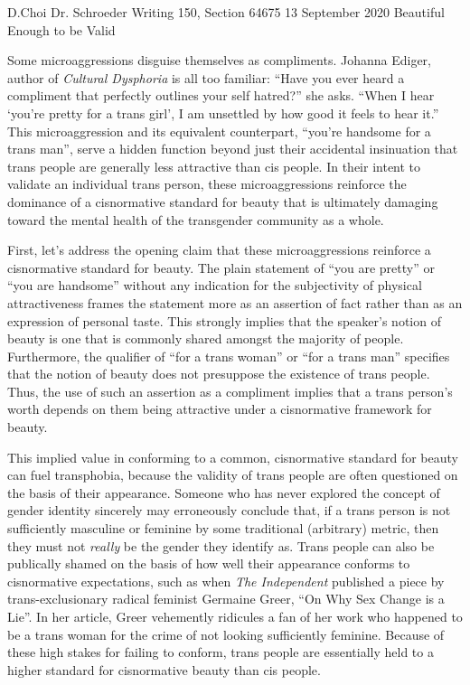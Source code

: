 \documentclass[12pt, letterpaper]{article}
\begin{document}
\begin{mla}
	{D.}{Choi}
	{Dr. Schroeder}
	{Writing 150, Section 64675}
	{13 September 2020}
	{Beautiful Enough to be Valid}

Some microaggressions disguise themselves as compliments. Johanna Ediger,
author of \textit{Cultural Dysphoria} is all too familiar: ``Have you ever
heard a compliment that perfectly outlines your self hatred?'' she asks.
``When I hear `you're pretty for a trans girl', I am unsettled by how good it
feels to hear it.'' This microaggression and its equivalent counterpart,
``you're handsome for a trans man'', serve a hidden function beyond just their
accidental insinuation that trans people are generally less attractive than
cis people. In their intent to validate an individual trans person, these
microaggressions reinforce the dominance of a cisnormative standard for beauty
that is ultimately damaging toward the mental health of the transgender
community as a whole.

First, let's address the opening claim that these microaggressions reinforce a
cisnormative standard for beauty. The plain statement of ``you are pretty''
or ``you are handsome'' without any indication for the subjectivity of
physical attractiveness frames the statement more as an assertion of fact
rather than as an expression of personal taste. This strongly implies that
the speaker's notion of beauty is one that is commonly shared amongst the
majority of people. Furthermore, the qualifier of ``for a trans woman'' or
``for a trans man'' specifies that the notion of beauty does not presuppose
the existence of trans people. Thus, the use of such an assertion as a
compliment implies that a trans person's worth depends on them being
attractive under a cisnormative framework for beauty.

This implied value in conforming to a common, cisnormative standard for beauty
can fuel transphobia, because the validity of trans people are often
questioned on the basis of their appearance. Someone who has never explored
the concept of gender identity sincerely may erroneously conclude that, if a
trans person is not sufficiently masculine or feminine by some traditional
(arbitrary) metric, then they must not \textit{really} be the gender they
identify as. Trans people can also be publically shamed on the basis of how
well their appearance conforms to cisnormative expectations, such as when
\textit{The Independent} published a piece by trans-exclusionary radical
feminist Germaine Greer, ``On Why Sex Change is a Lie''. In her article, Greer
vehemently ridicules a fan of her work who happened to be a trans woman for
the crime of not looking sufficiently feminine. Because of these high stakes
for failing to conform, trans people are essentially held to a higher standard
for cisnormative beauty than cis people.


\end{mla}
\end{document}
